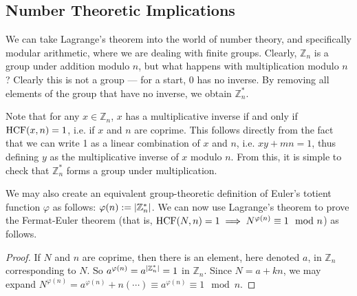 \subsection{Number Theoretic Implications}
We can take Lagrange's theorem into the world of number theory, and specifically modular arithmetic, where we are dealing with finite groups. Clearly, \(\mathbb Z_n\) is a group under addition modulo \(n\), but what happens with multiplication modulo \(n\)? Clearly this is not a group --- for a start, 0 has no inverse. By removing all elements of the group that have no inverse, we obtain \(\mathbb Z_n^*\).

Note that for any \(x \in \mathbb Z_n\), \(x\) has a multiplicative inverse if and only if \(\operatorname{HCF}(x, n) = 1\), i.e. if \(x\) and \(n\) are coprime. This follows directly from the fact that we can write 1 as a linear combination of \(x\) and \(n\), i.e. \(xy + mn = 1\), thus defining \(y\) as the multiplicative inverse of \(x\) modulo \(n\). From this, it is simple to check that \(\mathbb Z_n^*\) forms a group under multiplication.

We may also create an equivalent group-theoretic definition of Euler's totient function \(\varphi\) as follows: \(\varphi(n) := \abs{\mathbb Z_n^*}\). We can now use Lagrange's theorem to prove the Fermat-Euler theorem (that is, \(\operatorname{HCF}(N, n) = 1 \implies N^{\varphi(n)} \equiv 1 \mod n\)) as follows.
\begin{proof}
	If \(N\) and \(n\) are coprime, then there is an element, here denoted \(a\), in \(\mathbb Z_n\) corresponding to \(N\). So \(a^{\varphi(n)} = a^{\abs{\mathbb Z_n^*}} = 1\) in \(\mathbb Z_n\). Since \(N = a + kn\), we may expand \(N^{\varphi(n)} = a^{\varphi(n)} + n(\cdots) \equiv a^{\varphi(n)} \equiv 1 \mod n\).
\end{proof}
